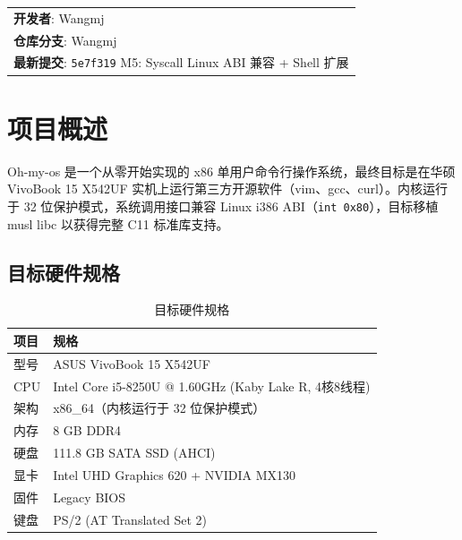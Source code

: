 \documentclass[12pt,a4paper]{article}
\begin{document}
\begin{titlepage}
\vspace{1.5cm}

{\normalsize
\begin{tabular}{l}
    \textbf{开发者}: Wangmj \\
    \textbf{仓库分支}: Wangmj \\
    \textbf{最新提交}: \texttt{5e7f319} M5: Syscall Linux ABI 兼容 + Shell 扩展 \\
\end{tabular}
\par}

\end{titlepage}

\newpage
\tableofcontents
\newpage

\section{项目概述}

Oh-my-os 是一个从零开始实现的 x86 单用户命令行操作系统，最终目标是在华硕 VivoBook 15 X542UF 实机上运行第三方开源软件（vim、gcc、curl）。内核运行于 32 位保护模式，系统调用接口兼容 Linux i386 ABI（\texttt{int 0x80}），目标移植 musl libc 以获得完整 C11 标准库支持。

\subsection{目标硬件规格}

\begin{table}[h]
\centering
\begin{tabular}{ll}
\toprule
\textbf{项目} & \textbf{规格} \\
\midrule
型号     & ASUS VivoBook 15 X542UF \\
CPU      & Intel Core i5-8250U @ 1.60GHz (Kaby Lake R, 4核8线程) \\
架构     & x86\_64（内核运行于 32 位保护模式）\\
内存     & 8 GB DDR4 \\
硬盘     & 111.8 GB SATA SSD (AHCI) \\
显卡     & Intel UHD Graphics 620 + NVIDIA MX130 \\
固件     & Legacy BIOS \\
键盘     & PS/2 (AT Translated Set 2) \\
\bottomrule
\end{tabular}
\caption{目标硬件规格}
\end{table}
\end{document}
